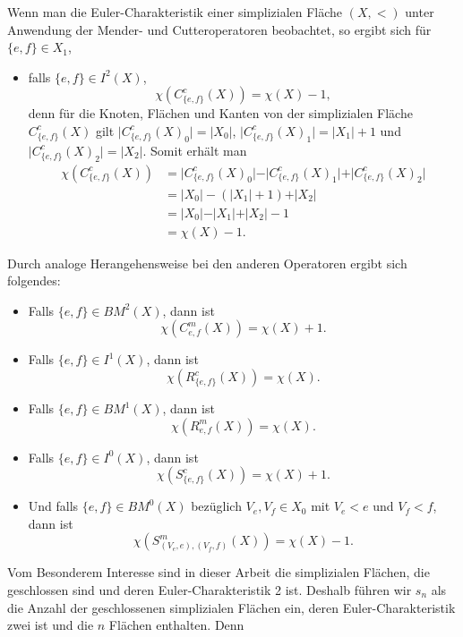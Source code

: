 \documentclass[12pt,titlepage]{article}
\begin{document}
Wenn man die Euler-Charakteristik einer simplizialen Fläche $(X,<)$ unter Anwendung der Mender- und Cutteroperatoren beobachtet, so ergibt sich für $\{e,f\} \in X_1$, 
\begin{itemize}
\item falls $\{e,f\} \in I^2(X)$,  
\[
\chi(C^c_{\{e,f\}}(X))=\chi(X)-1,
\]
denn für die Knoten, Flächen und Kanten von der simplizialen Fläche $C^c_{\{e,f\}}(X)$ gilt $\vert C^c_{\{e,f\}}(X)_0 \vert =\vert X_0\vert $, $\vert C^c_{\{e,f\}}(X)_1 \vert =\vert X_1\vert +1$ und $\vert C^c_{\{e,f\}}(X)_2 \vert =\vert X_2\vert $. Somit erhält man 
\begin{align*}
\chi(C^c_{\{e,f\}}(X))&=\vert C^c_{\{e,f\}}(X)_0 \vert-\vert C^c_{\{e,f\}}(X)_1 \vert+\vert C^c_{\{e,f\}}(X)_2 \vert\\
&=\vert X_0\vert-(\vert X_1\vert+1)+\vert X_2\vert\\
&=\vert X_0\vert-\vert X_1\vert+\vert X_2\vert -1\\
&=\chi(X)-1.
\end{align*}
\end{itemize}
Durch analoge Herangehensweise bei den anderen Operatoren ergibt sich folgendes:
\begin{itemize}
\item Falls $\{e,f\} \in BM^2(X)$, dann ist 
\[
\chi(C^m_{e,f}(X))=\chi(X)+1.
\]
\item Falls $\{e,f\} \in I^1(X)$, dann ist 
\[
\chi(R^c_{\{e,f\}}(X))=\chi(X).
\]
\item Falls $\{e,f\} \in BM^1(X)$, dann ist 
\[
\chi(R^m_{e,f}(X))=\chi(X).
\]
\item Falls $\{e,f\} \in I^0(X)$, dann ist 
\[
\chi(S^c_{\{e,f\}}(X))=\chi(X)+1.
\]
\item Und falls $\{e,f\} \in BM^0(X)$ bezüglich $V_e,V_f \in X_0$ mit $V_e<e$ und $V_f<f$, dann ist 
\[
\chi(S^m_{(V_e,e),(V_f,f)}(X))=\chi(X)-1.
\]
\end{itemize}
Vom Besonderem Interesse sind in dieser Arbeit die simplizialen Flächen, die geschlossen sind und deren Euler-Charakteristik 2 ist. Deshalb führen wir $s_n$ als die Anzahl der geschlossenen simplizialen Flächen ein, deren Euler-Charakteristik zwei ist und die $n$ Flächen enthalten.
Denn 
\newpage
\end{document}
